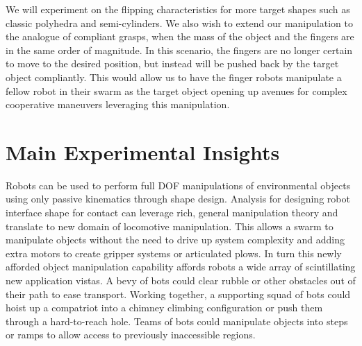 \documentclass[runningheads,a4paper]{llncs}
\begin{document}
We will experiment on the flipping characteristics for more target shapes such as classic polyhedra and semi-cylinders.
We also wish to extend our manipulation to the analogue of compliant grasps, when the mass of the object and the fingers are in the same order of magnitude.
In this scenario, the fingers are no longer certain to move to the desired position, but instead will be pushed back by the target object compliantly.
This would allow us to have the finger robots manipulate a fellow robot in their swarm as the target object opening up avenues for complex cooperative maneuvers leveraging this manipulation.

\clearpage
\section{Main Experimental Insights}
Robots can be used to perform full DOF manipulations of environmental objects using only passive kinematics through shape design.
Analysis for designing robot interface shape for contact can leverage rich, general manipulation theory and translate to new domain of locomotive manipulation.
This allows a swarm to manipulate objects without the need to drive up system complexity and adding extra motors to create gripper systems or articulated plows.
In turn this newly afforded object manipulation capability affords robots a wide array of scintillating new application vistas.
A bevy of bots could clear rubble or other obstacles out of their path to ease transport.
Working together, a supporting squad of bots could hoist up a compatriot into a chimney climbing configuration or push them through a hard-to-reach hole.
Teams of bots could manipulate objects into steps or ramps to allow access to previously inaccessible regions.

\clearpage


\end{document}
